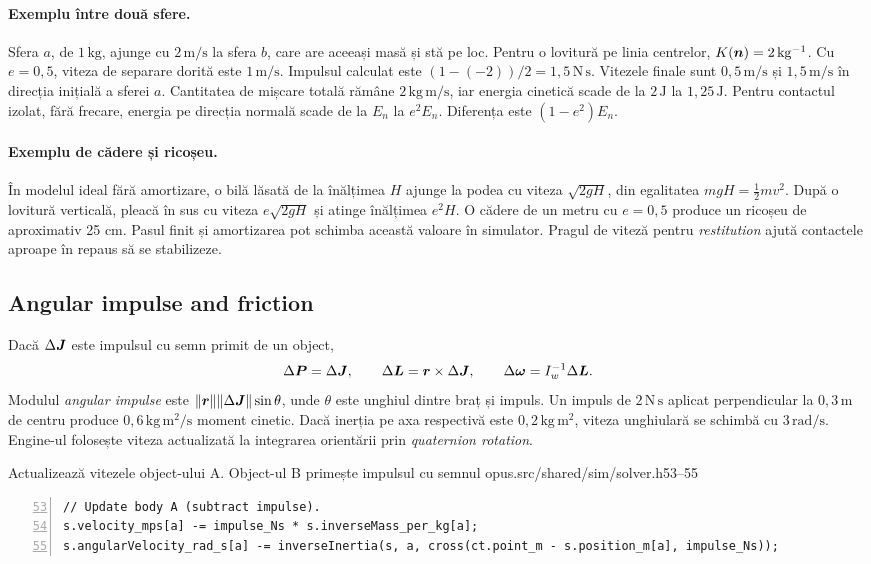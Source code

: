 \documentclass[11pt,a4paper]{article}
\begin{document}
\paragraph{Exemplu între două sfere.}
Sfera \(a\), de \(1\,\mathrm{kg}\), ajunge cu \(2\,\mathrm{m/s}\)
la sfera \(b\), care are aceeași masă și stă pe loc.
Pentru o lovitură pe linia centrelor,
\(K(\boldsymbol{n})=2\,\mathrm{kg^{-1}}\). Cu \(e=0{,}5\), viteza de
separare dorită este \(1\,\mathrm{m/s}\). Impulsul calculat este
\((1-(-2))/2=1{,}5\,\mathrm{N\,s}\). Vitezele finale sunt
\(0{,}5\,\mathrm{m/s}\) și \(1{,}5\,\mathrm{m/s}\) în direcția
inițială a sferei \(a\). Cantitatea de mișcare totală rămâne
\(2\,\mathrm{kg\,m/s}\), iar energia cinetică scade de la
\(2\,\mathrm J\) la \(1{,}25\,\mathrm J\). Pentru contactul
izolat, fără frecare, energia pe direcția normală scade de la
\(E_n\) la \(e^2 E_n\). Diferența este \((1-e^2)E_n\).

\paragraph{Exemplu de cădere și ricoșeu.}
În modelul ideal fără amortizare, o bilă lăsată de la înălțimea
\(H\) ajunge la podea cu viteza \(\sqrt{2gH}\), din egalitatea
\(mgH=\tfrac12mv^2\). După o lovitură verticală, pleacă în sus
cu viteza \(e\sqrt{2gH}\) și atinge înălțimea \(e^2H\).
O cădere de un metru cu \(e=0{,}5\) produce un ricoșeu de
aproximativ 25 cm. Pasul finit și amortizarea pot schimba
această valoare în simulator. Pragul de viteză pentru \emph{restitution} ajută
contactele aproape în repaus să se stabilizeze.

\subsection{Angular impulse and friction}

Dacă \(\Delta\boldsymbol{J}\) este impulsul cu semn primit de un object,
\begin{equation}
 \Delta\boldsymbol{P}=\Delta\boldsymbol{J},\qquad
 \Delta\boldsymbol{L}=\boldsymbol{r}\times\Delta\boldsymbol{J},\qquad
 \Delta\boldsymbol{\omega}=I_w^{-1}\Delta\boldsymbol{L}.
\end{equation}
Modulul \emph{angular impulse} este
\(\|\boldsymbol{r}\|\|\Delta\boldsymbol{J}\|\sin\theta\), unde \(\theta\)
este unghiul dintre braț și impuls. Un impuls de
\(2\,\mathrm{N\,s}\) aplicat perpendicular la \(0{,}3\,\mathrm m\)
de centru produce \(0{,}6\,\mathrm{kg\,m^2/s}\) moment cinetic.
Dacă inerția pe axa respectivă este \(0{,}2\,\mathrm{kg\,m^2}\),
viteza unghiulară se schimbă cu \(3\,\mathrm{rad/s}\).
Engine-ul folosește viteza actualizată la integrarea orientării prin
\emph{quaternion rotation}.
\begin{codefragment}{Actualizează vitezele object-ului A. Object-ul B primește impulsul cu semnul opus.}{src/shared/sim/solver.h}{53--55}
\begin{lstlisting}[numbers=left,firstnumber=53]
// Update body A (subtract impulse).
s.velocity_mps[a] -= impulse_Ns * s.inverseMass_per_kg[a];
s.angularVelocity_rad_s[a] -= inverseInertia(s, a, cross(ct.point_m - s.position_m[a], impulse_Ns));
\end{lstlisting}
\end{codefragment}
\end{document}
